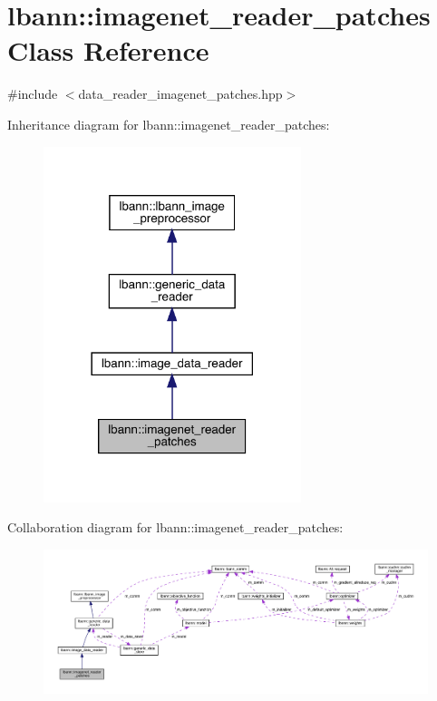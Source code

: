 \hypertarget{classlbann_1_1imagenet__reader__patches}{}\section{lbann\+:\+:imagenet\+\_\+reader\+\_\+patches Class Reference}
\label{classlbann_1_1imagenet__reader__patches}


{\ttfamily \#include $<$data\+\_\+reader\+\_\+imagenet\+\_\+patches.\+hpp$>$}



Inheritance diagram for lbann\+:\+:imagenet\+\_\+reader\+\_\+patches\+:\nopagebreak
\begin{figure}[H]
\begin{center}
\leavevmode
\includegraphics[width=213pt]{classlbann_1_1imagenet__reader__patches__inherit__graph}
\end{center}
\end{figure}


Collaboration diagram for lbann\+:\+:imagenet\+\_\+reader\+\_\+patches\+:\nopagebreak
\begin{figure}[H]
\begin{center}
\leavevmode
\includegraphics[width=350pt]{classlbann_1_1imagenet__reader__patches__coll__graph}
\end{center}
\end{figure}
